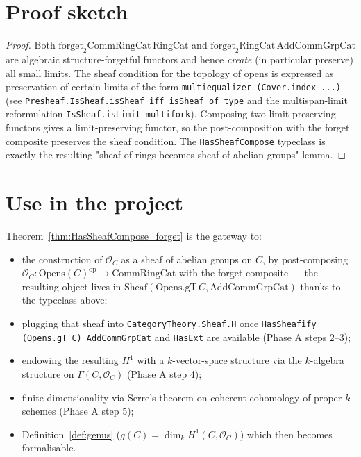 \section{Proof sketch}

\begin{proof}
  \leanok
  Both $\mathrm{forget}_2 \mathrm{CommRingCat}\, \mathrm{RingCat}$ and $\mathrm{forget}_2 \mathrm{RingCat}\, \mathrm{AddCommGrpCat}$ are algebraic structure-forgetful functors and hence \emph{create} (in particular preserve) all small limits. The sheaf condition for the topology of opens is expressed as preservation of certain limits of the form \lstinline{multiequalizer (Cover.index ...)} (see \lstinline{Presheaf.IsSheaf.isSheaf_iff_isSheaf_of_type} and the multispan-limit reformulation \lstinline{IsSheaf.isLimit_multifork}). Composing two limit-preserving functors gives a limit-preserving functor, so the post-composition with the forget composite preserves the sheaf condition. The \lstinline{HasSheafCompose} typeclass is exactly the resulting "sheaf-of-rings becomes sheaf-of-abelian-groups" lemma.
\end{proof}

\section{Use in the project}

Theorem~\ref{thm:HasSheafCompose_forget} is the gateway to:

\begin{itemize}
  \item the construction of $\mathcal O_C$ as a sheaf of abelian groups on $C$, by post-composing $\mathcal O_C : \mathrm{Opens}(C)^{\mathrm{op}} \to \mathrm{CommRingCat}$ with the forget composite — the resulting object lives in $\mathrm{Sheaf}(\mathrm{Opens.gT}\, C, \mathrm{AddCommGrpCat})$ thanks to the typeclass above;
  \item plugging that sheaf into \lstinline{CategoryTheory.Sheaf.H} once \lstinline{HasSheafify (Opens.gT C) AddCommGrpCat} and \lstinline{HasExt} are available (Phase A steps 2--3);
  \item endowing the resulting $H^1$ with a $k$-vector-space structure via the $k$-algebra structure on $\Gamma(C, \mathcal O_C)$ (Phase A step 4);
  \item finite-dimensionality via Serre's theorem on coherent cohomology of proper $k$-schemes (Phase A step 5);
  \item Definition~\ref{def:genus} ($g(C) = \dim_k H^1(C, \mathcal O_C)$) which then becomes formalisable.
\end{itemize}

